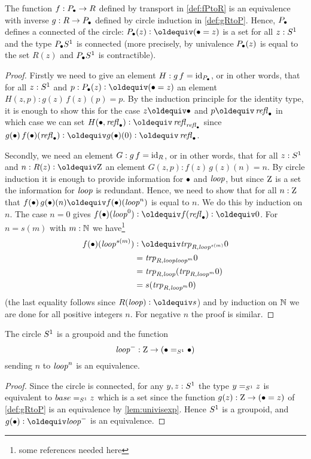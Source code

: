 \begin{lemma}
  \label{lem:univisexp}
  The function $f:P_\bullet\to R$ defined by transport in \cref{def:fPtoR} is an equivalence with inverse $g:R\to P_\bullet$ defined by circle induction in \cref{def:gRtoP}.  Hence, 
$P_\bullet$ defines a connected \covering of the circle: $P_\base(z)\defequi (\base=z)$ is a set for all $z:S^1$ and the type $P_\bullet S^1$ is connected (more precisely, by univalence $P_\bullet(z)$ is equal to the set $R(z)$ and $P_\bullet S^1$ is contractible).
\end{lemma}
\begin{proof}
  Firstly we need to give an element $H:g\,f=\mathord{\mathrm{id}}_{P_\bullet}$, or in other words, that for all $z:S^1$ and $p:P_\base(z)\defequi(\base=z)$ an element $H(z,p):g(z)\,f(z)(p)=p$.  By the induction principle for the identity type, it is enough to show this for the case $z\oldequiv\base$ and $p\oldequiv\refl\base$ in which case we can set $H(\base,\refl\base)\defequi\refl{\refl\base}$ since
$g(\base)\,f(\base)(\refl\base)\defequi g(\base)(0)\defequi\refl\base$.

Secondly, we need an element $G:g\,f=\mathord{\mathrm{id}}_{R}$, or in other words, that for all $z:S^1$ and $n:R(z)\defequi\zet$ an element $G(z,p):f(z)\,g(z)(n)=n$.  By circle induction it is enough to provide information for $\bullet$ and $\mathit{loop}$, but since $\mathrm{Z}$ is a set the information for $\mathit{loop}$ is redundant.  Hence, we need to show that for all $n:\mathrm{Z}$ that $f(\base)\,g(\base)(n)\oldequiv f(\base)(\Sloop^n)$ is equal to $n$.  We do this by induction on $n$.  The case $n=0$ gives $f(\base)(\Sloop^0)\defequi f(\refl\base)\defequi 0$.  For $n=s(m)$ with $m:\mathbb{N}$ we have\footnote{some references needed here} 
\begin{align*}
  f(\base)(\Sloop^{s(m)})&\defequi\trp_{R,\Sloop^{s(m)}}0\\
  &=\trp_{R,\Sloop \Sloop^{m}}0\\
  &=\trp_{R,\Sloop}(\trp_{R,\Sloop^m}0)\\
  &=s(\trp_{R,\Sloop^m}0)
\end{align*}
 (the last equality follows since $R(\Sloop)\defequi s$) and by induction on $\mathbb{N}$ we are done for all positive integers $n$.  For negative $n$ the proof is similar.
\end{proof}


\begin{corollary}\label{cor:S1groupoid}
  The circle $S^1$ is a groupoid and the function
$$\mathit{loop}^-:\mathrm{Z}\to(\bullet=_{S^1}\bullet)$$ sending $n$ to $\mathit{loop}^n$ is an equivalence.
\end{corollary}
\begin{proof}
  Since the circle is connected, for any $y,z:S^1$ the type $y=_{S^1}z$ is equivalent to $base=_{S^1}z$ which is a set since the function $g(z):\mathrm{Z}\to(\bullet=z)$ of \cref{def:gRtoP} is an equivalence by \cref{lem:univisexp}.  Hence $S^1$ is a groupoid, and $g(\base)\defequi\Sloop^-$ is an equivalence.
\end{proof}
